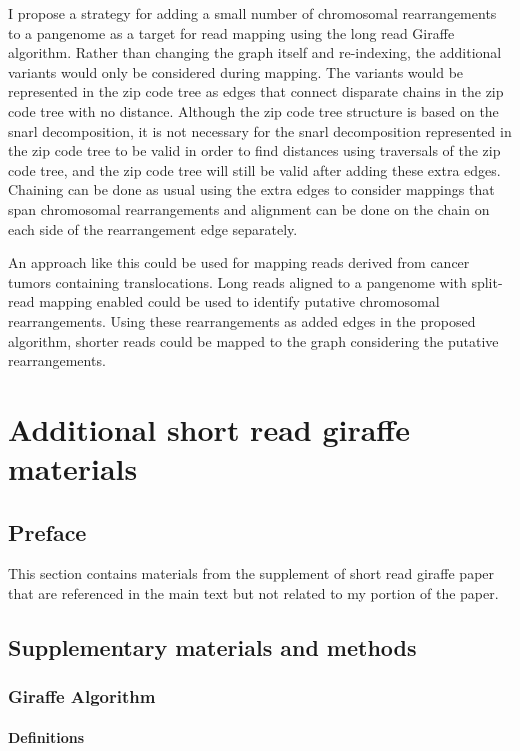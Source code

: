 \documentclass[11pt]{ucscthesis}
\begin{document}
I propose a strategy for adding a small number of chromosomal rearrangements to a pangenome as a target for read mapping using the long read Giraffe algorithm.
Rather than changing the graph itself and re-indexing, the additional variants would only be considered during mapping.
The variants would be represented in the zip code tree as edges that connect disparate chains in the zip code tree with no distance.
Although the zip code tree structure is based on the snarl decomposition, it is not necessary for the snarl decomposition represented in the zip code tree to be valid in order to find distances using traversals of the zip code tree, and the zip code tree will still be valid after adding these extra edges.
Chaining can be done as usual using the extra edges to consider mappings that span chromosomal rearrangements and alignment can be done on the chain on each side of the rearrangement edge separately.

An approach like this could be used for mapping reads derived from cancer tumors containing translocations.
Long reads aligned to a pangenome with split-read mapping enabled could be used to identify putative chromosomal rearrangements.
Using these rearrangements as added edges in the proposed algorithm, shorter reads could be mapped to the graph considering the putative rearrangements. 



\appendix
\chapter{Additional short read giraffe materials}
\label{sec:appendix_sr_giraffe}
\section{Preface}
This section contains materials from the supplement of short read giraffe paper \cite{sr_giraffe_2021} that are referenced in the main text but not related to my portion of the paper. 

\section{Supplementary materials and methods}
\subsection{Giraffe Algorithm}
\label{subsec:aim2:giraffe-methods}
\subsubsection{Definitions}
\end{document}
